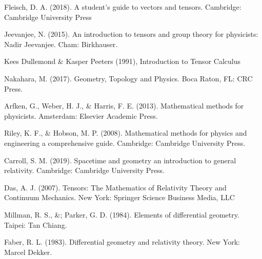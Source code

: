 \documentclass[a4paper,12pt]{book}
\begin{document}
\begin{thebibliography}{9}
	 Fleisch, D. A. (2018). A student's guide to vectors and tensors. Cambridge: Cambridge University Press
	
	 Jeevanjee, N. (2015). An introduction to tensors and group theory for physicists: Nadir Jeevanjee. Cham: Birkhauser.
	
	 Kees Dullemond \& Kasper Peeters (1991), Introduction to Tensor Calculus 
	
	 Nakahara, M. (2017). Geometry, Topology and Physics. Boca Raton, FL: CRC Press.
	
	 Arfken, G., Weber, H. J., \& Harris, F. E. (2013). Mathematical methods for physicists. Amsterdam: Elsevier Academic Press.
	
	 Riley, K. F., \& Hobson, M. P. (2008). Mathematical methods for physics and engineering a comprehensive guide. Cambridge: Cambridge University Press.
	
	 Carroll, S. M. (2019). Spacetime and geometry an introduction to general relativity. Cambridge: Cambridge University Press.
	
	 Das, A. J. (2007). Tensors: The Mathematics of Relativity Theory and Continuum Mechanics. New York: Springer Science Business Media, LLC
	
	 Millman, R. S., \&; Parker, G. D. (1984). Elements of differential geometry. Taipei: Tan Chiang.
	
	 Faber, R. L. (1983). Differential geometry and relativity theory. New York: Marcel Dekker.	
\end{thebibliography}
\end{document}
